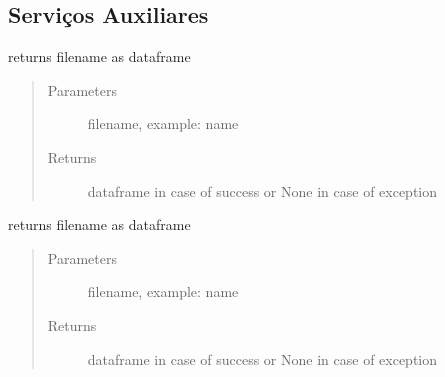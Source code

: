 \documentclass[letterpaper,10pt,english]{sphinxmanual}
\begin{document}
\subsection{Serviços Auxiliares}
\label{\detokenize{algorithms:servicos-auxiliares}}
\sphinxAtStartPar
{}

\label{\detokenize{algorithms:module-repository.repository_service}}

\begin{fulllineitems}
\label{\detokenize{algorithms:repository.repository_service.get_df_from_csv}}
\sphinxAtStartPar
returns filename as dataframe
\begin{quote}\begin{description}
\item[{Parameters}] \leavevmode
\sphinxAtStartPar
{} \textendash{} filename, example: name

\item[{Returns}] \leavevmode
\sphinxAtStartPar
dataframe in case of success or None in case of exception

\end{description}\end{quote}

\end{fulllineitems}


\begin{fulllineitems}
\label{\detokenize{algorithms:repository.repository_service.get_df_from_excel}}
\sphinxAtStartPar
returns filename as dataframe
\begin{quote}\begin{description}
\item[{Parameters}] \leavevmode
\sphinxAtStartPar
{} \textendash{} filename, example: name

\item[{Returns}] \leavevmode
\sphinxAtStartPar
dataframe in case of success or None in case of exception

\end{description}\end{quote}

\end{fulllineitems}
\end{document}
